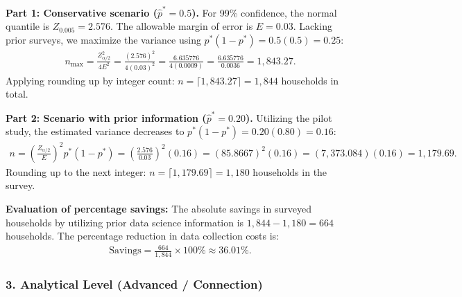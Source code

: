 \begin{solucion}
	\textbf{Part 1: Conservative scenario ($\hat{p}^* = 0.5$).}
	For 99\% confidence, the normal quantile is $Z_{0.005} = 2.576$. The allowable margin of error is $E = 0.03$. Lacking prior surveys, we maximize the variance using $p^*(1-p^*) = 0.5(0.5) = 0.25$:
	\begin{align}
		n_{\text{max}} = \frac{Z_{\alpha/2}^2}{4 E^2} = \frac{(2.576)^2}{4 (0.03)^2} = \frac{6.635776}{4 (0.0009)} = \frac{6.635776}{0.0036} = 1,843.27.
	\end{align}
	Applying rounding up by integer count: $n = \lceil 1,843.27 \rceil = 1,844$ households in total.
	
	\textbf{Part 2: Scenario with prior information ($\hat{p}^* = 0.20$).}
	Utilizing the pilot study, the estimated variance decreases to $p^*(1-p^*) = 0.20(0.80) = 0.16$:
	\begin{align}
		n = \left( \frac{Z_{\alpha/2}}{E} \right)^2 p^*(1-p^*) = \left( \frac{2.576}{0.03} \right)^2 (0.16) = (85.8667)^2 (0.16) = (7,373.084)(0.16) = 1,179.69.
	\end{align}
	Rounding up to the next integer: $n = \lceil 1,179.69 \rceil = 1,180$ households in the survey.
	
	\textbf{Evaluation of percentage savings:}
	The absolute savings in surveyed households by utilizing prior data science information is $1,844 - 1,180 = 664$ households. The percentage reduction in data collection costs is:
	\begin{align}
		\text{Savings} = \frac{664}{1,844} \times 100\% \approx 36.01\%.
	\end{align}
\end{solucion}

\subsubsection*{3. Analytical Level (Advanced / Connection)}

